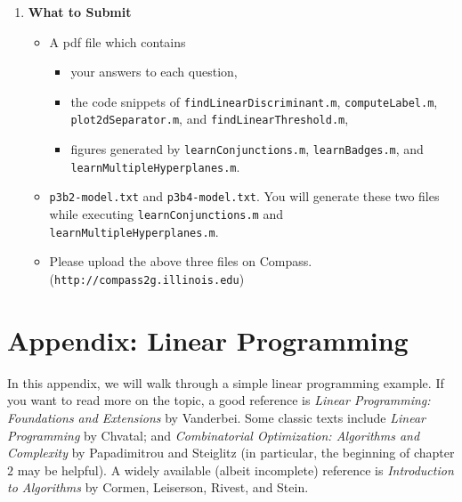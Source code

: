 \begin{enumerate}
\begin{enumerate}
\end{enumerate}
\item[] {\bf What to Submit}
  \begin{itemize}
    \item A pdf file which contains 
      \begin{itemize}
        \item your answers to each question,
        \item the code snippets of {\tt findLinearDiscriminant.m}, {\tt computeLabel.m}, {\tt plot2dSeparator.m}, and {\tt findLinearThreshold.m}, 
        \item figures generated by {\tt learnConjunctions.m}, {\tt learnBadges.m}, and {\tt learnMultipleHyperplanes.m}.
      \end{itemize}
    \item {\tt p3b2-model.txt} and {\tt p3b4-model.txt}. You will generate these two
      files while executing {\tt learnConjunctions.m} and {\tt learnMultipleHyperplanes.m}.
    \item Please upload the above three files on Compass. (\texttt{http://compass2g.illinois.edu})
  \end{itemize}

\end{enumerate}

\newpage

\section*{Appendix: Linear Programming}

In this appendix, we will walk through a simple linear programming
example. If you want to read more on the topic, a good reference is {\em Linear Programming: Foundations and
Extensions} by Vanderbei.  Some classic texts include {\em Linear Programming} by Chvatal;
and {\em Combinatorial Optimization: Algorithms and Complexity} by Papadimitrou
and Steiglitz (in particular, the beginning of chapter $2$ may be helpful).  A
widely available (albeit incomplete) reference is {\em Introduction to
Algorithms} by Cormen, Leiserson, Rivest, and Stein.

\vspace{3mm}

